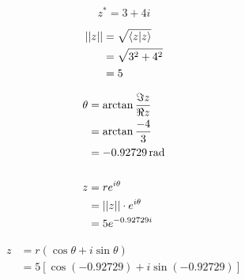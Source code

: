 \documentclass[12pt]{article}
\begin{document}
\problemsub
$$z^* = 3 + 4i$$

\problemsub
\begin{align*}
||z|| &= \sqrt{\braket{z|z}} \\
&= \sqrt{3^2+4^2} \\
&= 5
\end{align*}

\problemsub
\begin{align*}
\theta &= \arctan{\frac{\Im{z}}{\Re{z}}} \\
&= \arctan{\frac{-4}{3}} \\
&= \unit[-0.92729]{rad}
\\ \\
z &= re^{i\theta} \\
&= ||z|| \cdot e^{i\theta} \\
&= 5e^{-0.92729i}
\end{align*}

\newpage

\problemsub
\begin{align*}
z &= r(\cos{\theta} + i\sin{\theta}) \\
&= 5[\cos(-0.92729) + i\sin(-0.92729)]
\end{align*}

\problem

\end{document}
